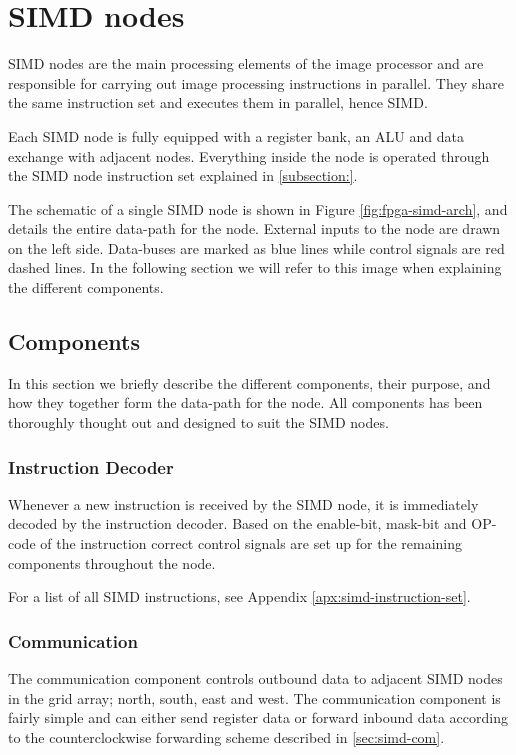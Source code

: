 \section{SIMD nodes}

\ac{SIMD} nodes are the main processing elements of the image processor and are
responsible for carrying out image processing instructions in parallel. They
share the same instruction set and executes them in parallel, hence
\acf{SIMD}.

Each \ac{SIMD} node is fully equipped with a register bank,
an \ac{ALU} and data exchange with adjacent nodes.
Everything inside the node is operated through the SIMD node
instruction set explained in \ref{subsection:}.

The schematic of a single \ac{SIMD} node is shown in Figure
\ref{fig:fpga-simd-arch}, and details the entire data-path for the
node. External inputs to the node are drawn on the left side. Data-buses are 
marked as blue lines while control signals are red dashed lines. In the 
following section we will refer to this image when explaining the different 
components.



\subsection{Components}
In this section we briefly describe the different components, their purpose, and
how they together form the data-path for the node. All components has been thoroughly
thought out and designed to suit the \ac{SIMD} nodes.  

\subsubsection{Instruction Decoder}
Whenever a new instruction is received by the \ac{SIMD} node, it is immediately 
decoded by the instruction decoder. Based on the enable-bit, mask-bit and OP-code
of the instruction correct control signals are set up for the remaining components
throughout the node.

For a list of all \ac{SIMD} instructions, see Appendix \ref{apx:simd-instruction-set}.

\subsubsection{Communication}
The communication component controls outbound data to adjacent \ac{SIMD} nodes in 
the grid array; north, south, east and west. The communication component is fairly 
simple and can either send register data or forward inbound data according to the 
counterclockwise forwarding scheme described in \ref{sec:simd-com}.

